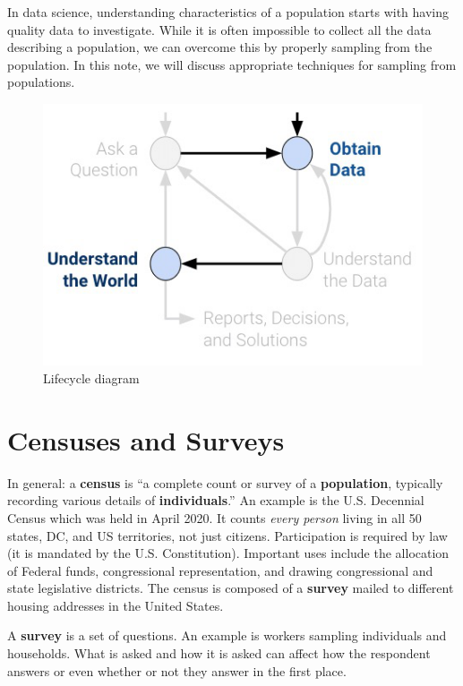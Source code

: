 \documentclass[
  letterpaper,
  DIV=11,
  numbers=noendperiod]{scrreprt}
\begin{document}
In data science, understanding characteristics of a population starts
with having quality data to investigate. While it is often impossible to
collect all the data describing a population, we can overcome this by
properly sampling from the population. In this note, we will discuss
appropriate techniques for sampling from populations.

\begin{figure}[H]

{\centering \includegraphics{sampling/images/data_life_cycle_sampling.png}

}

\caption{Lifecycle diagram}

\end{figure}%

\section{Censuses and Surveys}\label{censuses-and-surveys}

In general: a \textbf{census} is ``a complete count or survey of a
\textbf{population}, typically recording various details of
\textbf{individuals}.'' An example is the U.S. Decennial Census which
was held in April 2020. It counts \emph{every person} living in all 50
states, DC, and US territories, not just citizens. Participation is
required by law (it is mandated by the U.S. Constitution). Important
uses include the allocation of Federal funds, congressional
representation, and drawing congressional and state legislative
districts. The census is composed of a \textbf{survey} mailed to
different housing addresses in the United States.

A \textbf{survey} is a set of questions. An example is workers sampling
individuals and households. What is asked and how it is asked can affect
how the respondent answers or even whether or not they answer in the
first place.
\end{document}
